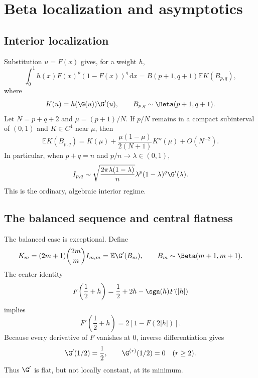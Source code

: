 \documentclass[11pt,oneside]{article}
\theoremstyle{definition}
\theoremstyle{remark}
\newcommand{\F}{F}
\newcommand{\E}{\mathbb E}
\newcommand{\dd}{\,\mathrm d}
\newcommand{\1}{\mathbf 1}
\begin{document}
\section{Beta localization and asymptotics}

\subsection{Interior localization}

Substitution \(u=\F(x)\) gives, for a weight \(h\),
\begin{equation}\label{p12:eq:betaloc}
 \int_0^1h(x)\F(x)^p(1-\F(x))^q\dd x
 =B(p+1,q+1)\E K(B_{p,q}),
\end{equation}
where
\begin{equation}
 K(u)=h(\G(u))\G'(u),
 \qquad B_{p,q}\sim\Beta(p+1,q+1).
\end{equation}
Let \(N=p+q+2\) and \(\mu=(p+1)/N\).  If \(p/N\) remains in a compact
subinterval of \((0,1)\) and \(K\in C^4\) near \(\mu\), then
\begin{equation}\label{p12:eq:betaexpansion}
 \E K(B_{p,q})
 =K(\mu)+\frac{\mu(1-\mu)}{2(N+1)}K''(\mu)+O(N^{-2}).
\end{equation}
In particular, when \(p+q=n\) and \(p/n\to\lambda\in(0,1)\),
\begin{equation}\label{p12:eq:Ipqasymptotic}
 I_{p,q}
 \sim \sqrt{\frac{2\pi\lambda(1-\lambda)}{n}}
 \lambda^p(1-\lambda)^q\G'(\lambda).
\end{equation}
This is the ordinary, algebraic interior regime.

\subsection{The balanced sequence and central flatness}

The balanced case is exceptional.  Define
\begin{equation}\label{p12:eq:Km}
 K_m=(2m+1)\binom{2m}{m}I_{m,m}
 =\E\G'(B_m),
 \qquad B_m\sim\Beta(m+1,m+1).
\end{equation}
The center identity
\begin{equation}\label{p12:eq:centerF}
 \F\!\left(\frac12+h\right)
 =\frac12+2h-\sgn(h)\F(|h|)
\end{equation}
implies
\begin{equation}\label{p12:eq:centerderivative}
 \F'\!\left(\frac12+h\right)=2[1-\F(2|h|)].
\end{equation}
Because every derivative of \(\F\) vanishes at \(0\), inverse differentiation
gives
\begin{equation}\label{p12:eq:Gflat}
 \G'(1/2)=\frac12,
 \qquad \G^{(r)}(1/2)=0\quad(r\ge2).
\end{equation}
Thus \(\G'\) is flat, but not locally constant, at its minimum.
\end{document}
